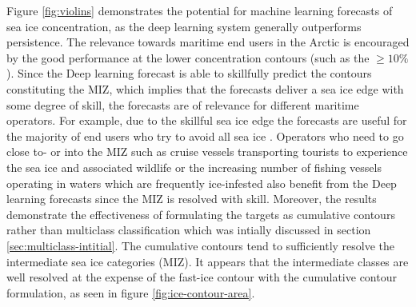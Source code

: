 \documentclass[../main/thesis]{subfiles}
\begin{document}
Figure \ref{fig:violins} demonstrates the potential for machine learning forecasts of sea ice concentration, as the deep learning system generally outperforms persistence. The relevance towards maritime end users in the Arctic is encouraged by the good performance at the lower concentration contours (such as the $\geq 10\%$). Since the Deep learning forecast is able to skillfully predict the contours constituting the MIZ, which implies that the forecasts deliver a sea ice edge with some degree of skill, the forecasts are of relevance for different maritime operators. For example, due to the skillful sea ice edge the forecasts are useful for the majority of end users who try to avoid all sea ice \citep{Wagner2020, Veland2021}. Operators who need to go close to- or into the MIZ such as cruise vessels transporting tourists to experience the sea ice and associated wildlife \citep{Palma2019} or the increasing number of fishing vessels operating in waters which are frequently ice-infested \citep{Stocker2020} also benefit from the Deep learning forecasts since the MIZ is resolved with skill. Moreover, the results demonstrate the effectiveness of formulating the targets as cumulative contours rather than multiclass classification which was intially discussed in section \ref{sec:multiclass-intitial}. The cumulative contours tend to sufficiently resolve the intermediate sea ice categories (MIZ). It appears that the intermediate classes are well resolved at the expense of the fast-ice contour with the cumulative contour formulation, as seen in figure \ref{fig:ice-contour-area}.
\end{document}
